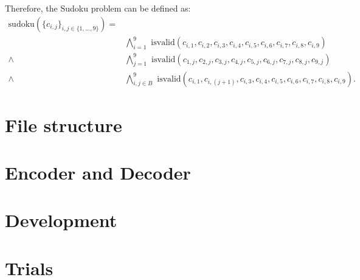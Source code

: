 \documentclass[]{usiinfprospectus}
\begin{document}
\noindent
Therefore, the Sudoku problem can be defined as:
\setcounter{equation}{0}
\begin{align}
\text{sudoku}\left( \{ c_{i,j} \}_{i, j \in \{ 1,...,9\}} \right) = & \nonumber\\
&\bigwedge^9_{i=1} \text{ isvalid}\left(  c_{i,1},  c_{i,2},  c_{i,3},  c_{i,4},  c_{i,5},  c_{i,6},  c_{i,7},  c_{i,8},  c_{i,9}  \right)\\
\wedge &\bigwedge^9_{j=1} \text{ isvalid}\left( c_{1,j},  c_{2,j},  c_{3,j},  c_{4,j},  c_{5,j},  c_{6,j},  c_{7,j},  c_{8,j},  c_{9,j} \right) \\
\wedge &\bigwedge^9_{i,j \in B} \text{ isvalid}\left( c_{i,1},  c_{i,(j+1)},  c_{i,3},  c_{i,4},  c_{i,5},  c_{i,6},  c_{i,7},  c_{i,8},  c_{i,9} \right).
\end{align}
\section{File structure} \label{problem}
\section{Encoder and Decoder}\label{encdec}
\section{Development} \label{development}
\section{Trials} \label{trials}


\end{document}
